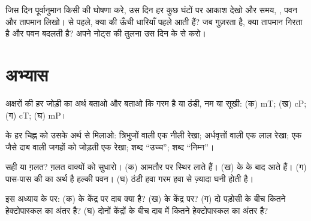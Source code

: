 \begin{inthefield}[वाताग्र को आते देखना]
जिस दिन पूर्वानुमान किसी  की घोषणा करे, उस दिन हर कुछ घंटों पर आकाश देखो और
समय, , पवन और तापमान लिखो।  से पहले, क्या  की ऊँची धारियाँ
पहले आती हैं? जब  गुज़रता है, क्या तापमान गिरता है और पवन बदलती है? अपने
नोट्स की तुलना उस दिन के   से
करो।
\end{inthefield}

\section{अभ्यास}

\begin{exercise}[$\star$]\label{exo:g8:fronts-and-weather-maps:1}
अक्षरों की हर जोड़ी का अर्थ बताओ और बताओ कि  गरम है या ठंडी, नम या सूखी:
(क) mT; (ख) cP; (ग) cT; (घ) mP।
\end{exercise}

\begin{exercise}[$\star$]\label{exo:g8:fronts-and-weather-maps:2}
  के हर चिह्न को उसके अर्थ से मिलाओ: त्रिभुजों वाली एक नीली रेखा;
अर्धवृत्तों वाली एक लाल रेखा; एक जैसे दाब वाली जगहों को जोड़ती एक रेखा; शब्द
``उच्च''; शब्द ``निम्न''।
\end{exercise}

\begin{exercise}[$\star$]\label{exo:g8:fronts-and-weather-maps:3}
सही या ग़लत? ग़लत वाक्यों को सुधारो। (क)  आमतौर पर स्थिर  लाते हैं।
(ख)  के   के बाद आते हैं। (ग) पास-पास की  का अर्थ
है हल्की पवन। (घ) ठंडी हवा गरम हवा से ज़्यादा घनी होती
है।
\end{exercise}

\begin{exercise}[$\star$]\label{exo:g8:fronts-and-weather-maps:4}
इस अध्याय के   पर: (क)  के केंद्र पर दाब क्या है? (ख) 
के केंद्र पर? (ग) दो पड़ोसी  के बीच कितने हेक्टोपास्कल का अंतर है?
(घ) दोनों केंद्रों के बीच दाब में कितने हेक्टोपास्कल का अंतर
है?
\end{exercise}

